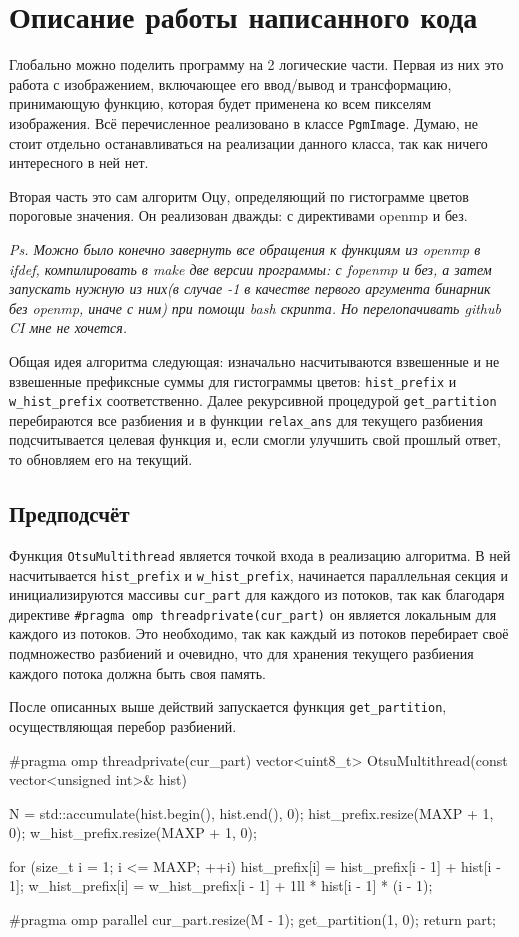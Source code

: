 \documentclass[14pt, russian, onesize]{extreport}
\begin{document}
\section*{Описание работы написанного кода}
Глобально можно поделить программу на 2 логические части. Первая из них это 
работа с изображением, включающее его ввод\slash вывод и трансформацию,
принимающую функцию, которая будет применена ко всем пикселям изображения.
Всё перечисленное реализовано в классе \texttt{PgmImage}. Думаю, не стоит отдельно
останавливаться на реализации данного класса, так как ничего интересного в ней
нет.

Вторая часть это сам алгоритм Оцу, определяющий по гистограмме цветов пороговые 
значения. Он реализован дважды: с директивами openmp и без. 

\textit{
Ps. Можно было конечно
завернуть все обращения к функциям из openmp в ifdef, компилировать в make две
версии программы: с fopenmp и без, а затем запускать нужную из них(в случае
-1 в качестве первого аргумента бинарник без openmp, иначе с ним) при
помощи bash скрипта. Но перелопачивать github CI мне не хочется.
}

Общая идея алгоритма следующая: изначально насчитываются взвешенные и не
взвешенные префиксные суммы для гистограммы цветов: 
\texttt{hist\_prefix} и \texttt{w\_hist\_prefix} соответственно. Далее
рекурсивной процедурой \texttt{get\_partition} перебираются все
разбиения и в функции \texttt{relax\_ans} для текущего разбиения 
подсчитывается целевая функция и, если смогли улучшить свой прошлый ответ, то
обновляем его на текущий.

\subsection*{Предподсчёт}
Функция \texttt{OtsuMultithread} является точкой входа в реализацию алгоритма.
В ней насчитывается \texttt{hist\_prefix} и \texttt{w\_hist\_prefix}, начинается
параллельная секция и инициализируются массивы \texttt{cur\_part} для каждого
из потоков, так как благодаря директиве \texttt{\#pragma omp threadprivate(cur\_part)}
он является локальным для каждого из потоков. Это необходимо, так как
каждый из потоков перебирает своё подмножество разбиений и очевидно, что для
хранения текущего разбиения каждого потока должна быть своя память.

После описанных выше действий запускается функция \texttt{get\_partition},
осуществляющая перебор разбиений.

\begin{cppcode}
#pragma omp threadprivate(cur_part)
vector<uint8_t> OtsuMultithread(const vector<unsigned int>& hist) {
    N = std::accumulate(hist.begin(), hist.end(), 0);
    hist_prefix.resize(MAXP + 1, 0);
    w_hist_prefix.resize(MAXP + 1, 0);

    for (size_t i = 1; i <= MAXP; ++i) {
        hist_prefix[i] = hist_prefix[i - 1] + hist[i - 1];
        w_hist_prefix[i] = w_hist_prefix[i - 1] + 1ll * hist[i - 1] * (i - 1);
    }

#pragma omp parallel 
    {
        cur_part.resize(M - 1);
        get_partition(1, 0);
    }
    return part;
}
\end{cppcode}
\end{document}
